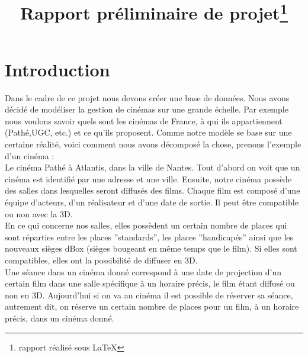 \documentclass[a4paper,sffamily,12pt]{article}
\title{\vspace{\fill}\LARGE\bfseries\sffamily Rapport préliminaire de projet\protect\footnote{rapport réalisé sous \LaTeX} \vspace{\fill}}
\begin{document}
	\date{} %
	\maketitle %

	\thispagestyle{fancy} %
	
	\newpage
			
	\renewcommand{\contentsname}{Sommaire}
	\tableofcontents
	
	\newpage
	
	\section{Introduction}
		
		\vspace{0.5cm}
		
		Dans le cadre de ce projet nous devons créer une base de données. Nous avons décidé de modéliser la gestion de cinémas sur une grande échelle. Par exemple nous voulons savoir quels sont les cinémas de France, à qui ils appartiennent (Pathé,UGC, etc.) et ce qu'ils proposent. Comme notre modèle se base sur une certaine réalité, voici comment nous avons décomposé la chose, prenons  l'exemple d'un cinéma : \\
		\indent Le cinéma Pathé à Atlantis, dans la ville de Nantes. Tout d'abord on voit que un cinéma est identifié par une adresse et une ville. Ensuite, notre cinéma possède des salles dans lesquelles seront diffusés des films. Chaque film est composé d'une équipe d'acteurs, d'un réalisateur et d'une date de sortie. Il peut être compatible ou non avec la 3D. \\ 				
		\indent En ce qui concerne nos salles, elles possèdent un certain nombre de places qui sont réparties entre les places ''standards'', les places ''handicapés'' ainsi que les nouveaux sièges dBox (sièges bougeant en même temps que le film). Si elles sont compatibles, elles ont la possibilité de diffuser en 3D. \\
		\indent Une séance dans un cinéma donné correspond à une date de projection d'un certain film dans une salle spécifique à un horaire précis, le film étant diffusé ou non en 3D. Aujourd'hui si on va au cinéma il est possible de réserver sa séance, autrement dit, on réserve un certain nombre de places pour un film, à un horaire précis, dans un cinéma donné. 

		\vspace{0.5cm}
	
\end{document}
